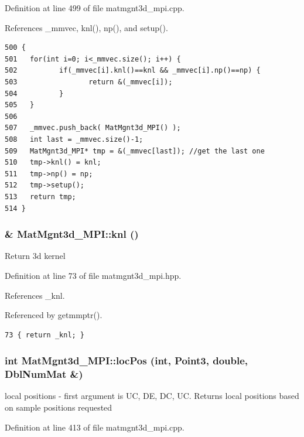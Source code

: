 Definition at line 499 of file matmgnt3d\_\-mpi.cpp.

References \_\-mmvec, knl(), np(), and setup().

\footnotesize\begin{verbatim}500 {
501   for(int i=0; i<_mmvec.size(); i++) {
502          if(_mmvec[i].knl()==knl && _mmvec[i].np()==np) {
503                 return &(_mmvec[i]);
504          }
505   }
506   
507   _mmvec.push_back( MatMgnt3d_MPI() );
508   int last = _mmvec.size()-1;
509   MatMgnt3d_MPI* tmp = &(_mmvec[last]); //get the last one
510   tmp->knl() = knl;
511   tmp->np() = np;
512   tmp->setup();
513   return tmp;
514 }
\end{verbatim}\normalsize 


\subsubsection{\& Mat\-Mgnt3d\_\-MPI::knl ()\hspace{0.3cm}{\tt  [inline]}}\label{classMatMgnt3d__MPI_d01911fc223ab4bc9604db12f942194e_d01911fc223ab4bc9604db12f942194e}


Return 3d kernel 

Definition at line 73 of file matmgnt3d\_\-mpi.hpp.

References \_\-knl.

Referenced by getmmptr().

\footnotesize\begin{verbatim}73 { return _knl; }
\end{verbatim}\normalsize 


\subsubsection{\setlength{\rightskip}{0pt plus 5cm}int Mat\-Mgnt3d\_\-MPI::loc\-Pos (int, Point3, double, Dbl\-Num\-Mat \&)}\label{classMatMgnt3d__MPI_63fec50e1737f9e7f1160ac3f4d5e05e_63fec50e1737f9e7f1160ac3f4d5e05e}


local positions - first argument is UC, DE, DC, UC. Returns local positions based on sample positions requested 

Definition at line 413 of file matmgnt3d\_\-mpi.cpp.

